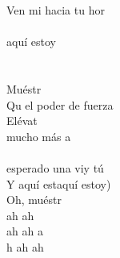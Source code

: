 \begin{cancion}
	Ven mi hacia tu hor\\
	\jump\\
aquí estoy\\
	\jump\\
	\jump\\
	Muéstr    \\
	Qu el poder de fuerza\\
	Elévat    \\
	mucho más a \\
	\jump\\
	 esperado una viy tú\\
	Y aquí estaquí estoy)         \\
	Oh, muéstr   \\
	ah ah\\
	ah ah a\\
	h ah ah\\
\end{cancion}%
